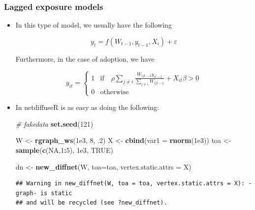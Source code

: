\documentclass[]{book}
\newenvironment{Shaded}{\begin{snugshade}}{\end{snugshade}}
\newcommand{\CommentTok}[1]{\textcolor[rgb]{0.56,0.35,0.01}{\textit{#1}}}
\newcommand{\DataTypeTok}[1]{\textcolor[rgb]{0.13,0.29,0.53}{#1}}
\newcommand{\DecValTok}[1]{\textcolor[rgb]{0.00,0.00,0.81}{#1}}
\newcommand{\FloatTok}[1]{\textcolor[rgb]{0.00,0.00,0.81}{#1}}
\newcommand{\KeywordTok}[1]{\textcolor[rgb]{0.13,0.29,0.53}{\textbf{#1}}}
\newcommand{\NormalTok}[1]{#1}
\newcommand{\OperatorTok}[1]{\textcolor[rgb]{0.81,0.36,0.00}{\textbf{#1}}}
\newcommand{\OtherTok}[1]{\textcolor[rgb]{0.56,0.35,0.01}{#1}}
\newcommand{\StringTok}[1]{\textcolor[rgb]{0.31,0.60,0.02}{#1}}
\begin{document}
\hypertarget{lagged-exposure-models}{%
\subsubsection{Lagged exposure models}\label{lagged-exposure-models}}

\begin{itemize}
\item
  In this type of model, we usually have the following

  \[
  y_t = f(W_{t-1}, y_{t-1}, X_i) + \varepsilon
  \]

  Furthermore, in the case of adoption, we have

  \[
  y_{it} = \left\{
  \begin{array}{ll}
  1 & \mbox{if}\quad \rho\sum_{j\neq i}\frac{W_{ijt-1}y_{it-1}}{\sum_{j\neq i}W_{ijt-1}} + X_{it}\beta > 0\\
  0 & \mbox{otherwise}
  \end{array}
  \right.
  \]
\item
  In netdiffuseR is as easy as doing the following:

\begin{Shaded}
\begin{Highlighting}[]
\CommentTok{# fakedata}
\KeywordTok{set.seed}\NormalTok{(}\DecValTok{121}\NormalTok{)}

\NormalTok{W   <-}\StringTok{ }\KeywordTok{rgraph_ws}\NormalTok{(}\FloatTok{1e3}\NormalTok{, }\DecValTok{8}\NormalTok{, }\FloatTok{.2}\NormalTok{)}
\NormalTok{X   <-}\StringTok{ }\KeywordTok{cbind}\NormalTok{(}\DataTypeTok{var1 =} \KeywordTok{rnorm}\NormalTok{(}\FloatTok{1e3}\NormalTok{))}
\NormalTok{toa <-}\StringTok{ }\KeywordTok{sample}\NormalTok{(}\KeywordTok{c}\NormalTok{(}\OtherTok{NA}\NormalTok{,}\DecValTok{1}\OperatorTok{:}\DecValTok{5}\NormalTok{), }\FloatTok{1e3}\NormalTok{, }\OtherTok{TRUE}\NormalTok{)}

\NormalTok{dn  <-}\StringTok{ }\KeywordTok{new_diffnet}\NormalTok{(W, }\DataTypeTok{toa=}\NormalTok{toa, }\DataTypeTok{vertex.static.attrs =}\NormalTok{ X)}
\end{Highlighting}
\end{Shaded}

\begin{verbatim}
## Warning in new_diffnet(W, toa = toa, vertex.static.attrs = X): -graph- is static
## and will be recycled (see ?new_diffnet).
\end{verbatim}

\begin{Shaded}
\end{Shaded}
\end{itemize}
\end{document}
